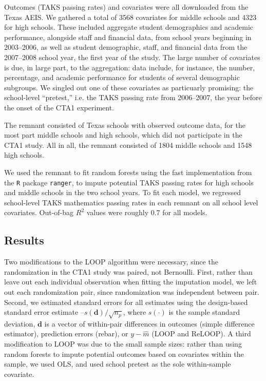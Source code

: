Outcomes (TAKS passing rates) and covariates were all downloaded from
the Texas AEIS.
We gathered a total of 3568 covariates for middle schools
and 4323 for high schools.
These included aggregate student demographics and academic
performance, alongside staff and financial data, from school years
beginning in 2003--2006, as well as student demographic, staff, and
financial data from the 2007--2008 school year, the first year of the
study.
The large number of covariates is due, in large part, to the
aggregation: data include, for instance, the number, percentage, and
academic performance for students of several demographic subgroups.
We singled out one of these covariates as particuarly promising: the
school-level ``pretest,'' i.e. the TAKS passing rate from 2006--2007,
the year before the onset of the CTA1 experiment.

The remnant consisted of Texas schools with observed outcome data,
for the most part middle schools and high schools, which
did not participate in the CTA1 study.
All in all, the remnant consisted of 1804 middle schools and
1548 high schools.

We used the remnant to fit random forests \citep{randomForest} using
the fast implementation from the \texttt{R} package \texttt{ranger},
to impute potential
TAKS passing rates for high schools and middle schools in the two
school years.
To fit each model, we regressed school-level TAKS mathematics passing
rates in each remnant on all school level covariates.
Out-of-bag $R^2$ values were roughly 0.7 for all models.

\subsection{Results}

Two modifications to the LOOP algorithm were necessary, since the randomization in the
CTA1 study was paired, not Bernoulli.
First, rather than leave out each individual observation when fitting
the imputation model, we left out each randomization pair, since
randomization was independent between pair.
Second, we estimated standard errors for all estimates using the
design-based standard error estimate
\citep[e.g.][]{gadbury2001randomization}--$s(\bm{d})/\sqrt{n_p}$,
where $s(\cdot)$ is the sample standard deviation, $\bm{d}$ is a
vector of within-pair differences in outcomes (simple difference
estimator), prediction errors (rebar), or $y-\hat{m}$ (LOOP and
ReLOOP).
A third modification to LOOP was due to the small sample sizes: rather than
using random forests to impute potential outcomes based on covariates
within the sample, we used OLS, and used school pretest as the sole
within-sample covariate.

